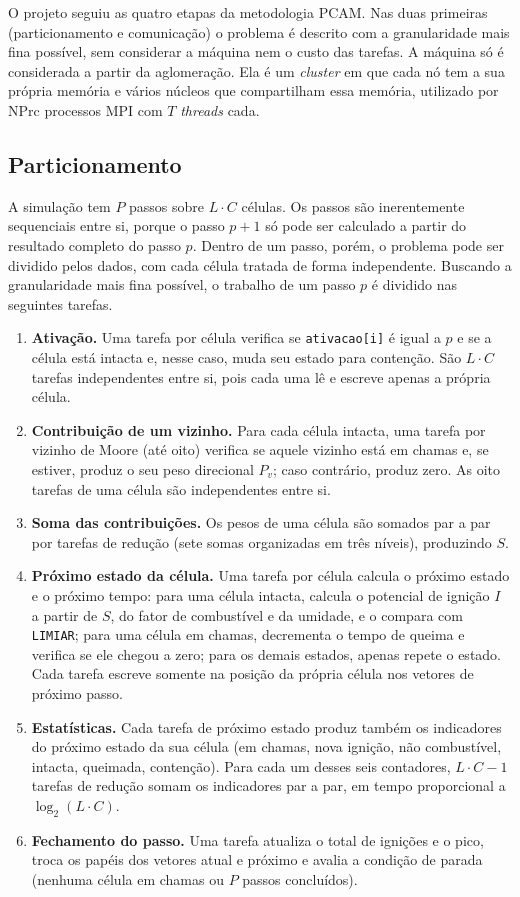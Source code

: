 \documentclass[11pt,a4paper]{article}
\begin{document}
O projeto seguiu as quatro etapas da metodologia PCAM. Nas duas primeiras (particionamento e comunicação) o problema é descrito com a granularidade mais fina possível, sem considerar a máquina nem o custo das tarefas. A máquina só é considerada a partir da aglomeração. Ela é um \emph{cluster} em que cada nó tem a sua própria memória e vários núcleos que compartilham essa memória, utilizado por NPrc processos MPI com $T$ \emph{threads} cada.

\subsection{Particionamento}
\label{sec:particionamento}

A simulação tem $P$ passos sobre $L \cdot C$ células. Os passos são inerentemente sequenciais entre si, porque o passo $p+1$ só pode ser calculado a partir do resultado completo do passo $p$. Dentro de um passo, porém, o problema pode ser dividido pelos dados, com cada célula tratada de forma independente. Buscando a granularidade mais fina possível, o trabalho de um passo $p$ é dividido nas seguintes tarefas.

\begin{enumerate}[label=(\roman*)]
    \item \textbf{Ativação.} Uma tarefa por célula verifica se \texttt{ativacao[i]} é igual a $p$ e se a célula está intacta e, nesse caso, muda seu estado para contenção. São $L \cdot C$ tarefas independentes entre si, pois cada uma lê e escreve apenas a própria célula.
    \item \textbf{Contribuição de um vizinho.} Para cada célula intacta, uma tarefa por vizinho de Moore (até oito) verifica se aquele vizinho está em chamas e, se estiver, produz o seu peso direcional $P_v$; caso contrário, produz zero. As oito tarefas de uma célula são independentes entre si.
    \item \textbf{Soma das contribuições.} Os pesos de uma célula são somados par a par por tarefas de redução (sete somas organizadas em três níveis), produzindo $S$.
    \item \textbf{Próximo estado da célula.} Uma tarefa por célula calcula o próximo estado e o próximo tempo: para uma célula intacta, calcula o potencial de ignição $I$ a partir de $S$, do fator de combustível e da umidade, e o compara com \texttt{LIMIAR}; para uma célula em chamas, decrementa o tempo de queima e verifica se ele chegou a zero; para os demais estados, apenas repete o estado. Cada tarefa escreve somente na posição da própria célula nos vetores de próximo passo.
    \item \textbf{Estatísticas.} Cada tarefa de próximo estado produz também os indicadores do próximo estado da sua célula (em chamas, nova ignição, não combustível, intacta, queimada, contenção). Para cada um desses seis contadores, $L \cdot C - 1$ tarefas de redução somam os indicadores par a par, em tempo proporcional a $\log_2 (L \cdot C)$.
    \item \textbf{Fechamento do passo.} Uma tarefa atualiza o total de ignições e o pico, troca os papéis dos vetores atual e próximo e avalia a condição de parada (nenhuma célula em chamas ou $P$ passos concluídos).
\end{enumerate}
\end{document}
